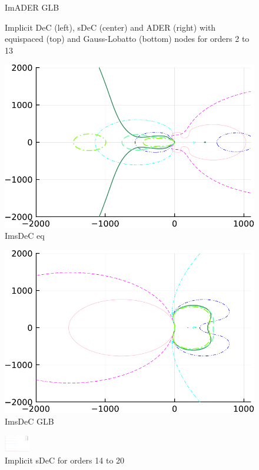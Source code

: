 \begin{figure}
\begin{minipage}[t]{0.32\textwidth}
		ImADER GLB
	\end{minipage}
	\caption{Implicit DeC (left), sDeC (center) and ADER (right) with equispaced (top) and Gauss-Lobatto (bottom) nodes for orders 2 to 13}
	\label{fig: ODEIMDeCADER}
\end{figure}

\begin{figure}
	\centering
	\begin{minipage}[t]{0.33\textwidth}
		\centering
		\includegraphics[width=\textwidth, trim={0 0 0 0}, clip]{pdf/odepics/ImsDeC_eq_ord20-crop.pdf}\\
		ImsDeC eq
	\end{minipage}
	\begin{minipage}[t]{0.33\textwidth}
		\centering
		\includegraphics[width=\textwidth, trim={0 0 0 0}, clip]{pdf/odepics/ImsDeC_GLB_ord20-crop.pdf}\\
		ImsDeC GLB
	\end{minipage}
	\includegraphics[width=0.1\textwidth, trim={491 230 30 23}, clip]{pdf/odepics/colors_a-d_new_14-20_no_order.pdf}
	\caption{Implicit sDeC for orders 14 to 20}
	\label{fig: exaImsDeC_high}
\end{figure}
